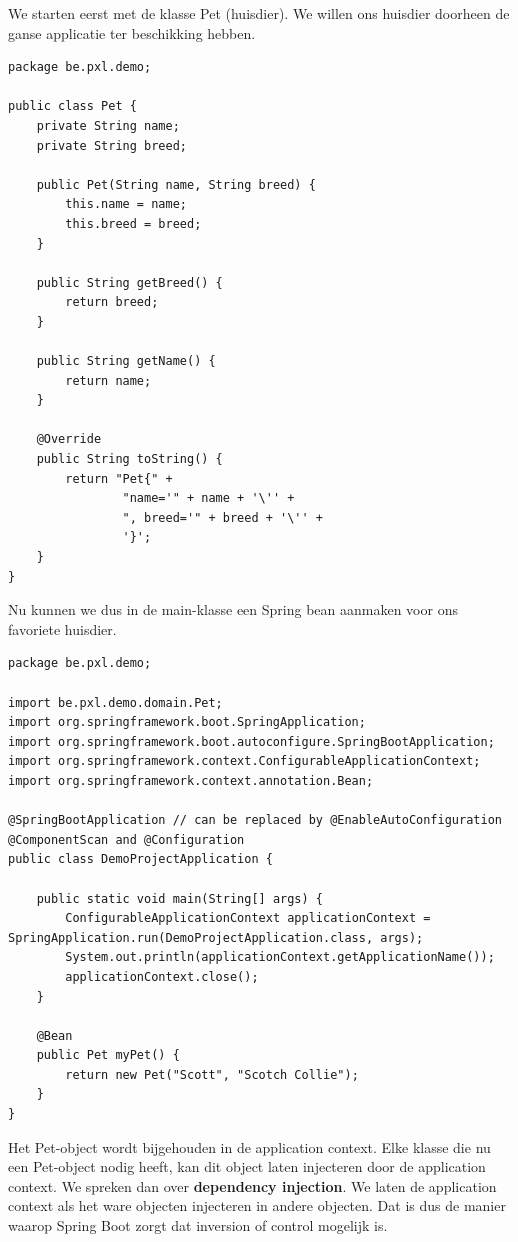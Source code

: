 We starten eerst met de klasse Pet (huisdier). We willen ons huisdier doorheen de ganse applicatie ter beschikking hebben.

\begin{lstlisting}
package be.pxl.demo;

public class Pet {
	private String name;
	private String breed;

	public Pet(String name, String breed) {
		this.name = name;
		this.breed = breed;
	}

	public String getBreed() {
		return breed;
	}

	public String getName() {
		return name;
	}

	@Override
	public String toString() {
		return "Pet{" +
				"name='" + name + '\'' +
				", breed='" + breed + '\'' +
				'}';
	}
}
\end{lstlisting}
 
Nu kunnen we dus in de main-klasse een Spring bean aanmaken voor ons favoriete huisdier.

\begin{lstlisting}
package be.pxl.demo;

import be.pxl.demo.domain.Pet;
import org.springframework.boot.SpringApplication;
import org.springframework.boot.autoconfigure.SpringBootApplication;
import org.springframework.context.ConfigurableApplicationContext;
import org.springframework.context.annotation.Bean;

@SpringBootApplication // can be replaced by @EnableAutoConfiguration @ComponentScan and @Configuration
public class DemoProjectApplication {

	public static void main(String[] args) {
		ConfigurableApplicationContext applicationContext = SpringApplication.run(DemoProjectApplication.class, args);
		System.out.println(applicationContext.getApplicationName());
		applicationContext.close();
	}

	@Bean
	public Pet myPet() {
		return new Pet("Scott", "Scotch Collie");
	}
}
\end{lstlisting}

Het Pet-object wordt bijgehouden in de application context.
Elke klasse die nu een Pet-object nodig heeft, kan dit object laten injecteren door de application context.
We spreken dan over \textbf{dependency injection}. We laten de application context als het ware objecten injecteren in andere objecten. Dat is dus de manier waarop Spring Boot zorgt dat inversion of control mogelijk is.

